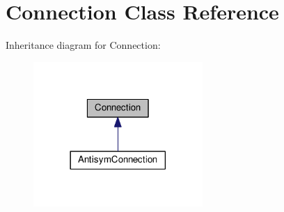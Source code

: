 \hypertarget{classConnection}{}\section{Connection Class Reference}
\label{classConnection}


Inheritance diagram for Connection\+:
\nopagebreak
\begin{figure}[H]
\begin{center}
\leavevmode
\includegraphics[width=182pt]{classConnection__inherit__graph}
\end{center}
\end{figure}

